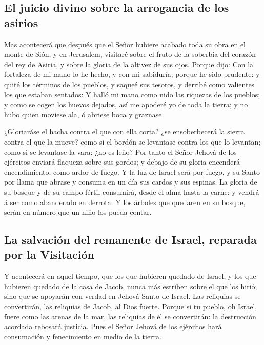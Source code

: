 \hypertarget{el-juicio-divino-sobre-la-arrogancia-de-los-asirios}{%
\subsection{El juicio divino sobre la arrogancia de los
asirios}\label{el-juicio-divino-sobre-la-arrogancia-de-los-asirios}}

 Mas acontecerá que después que el Señor hubiere acabado
toda su obra en el monte de Sión, y en Jerusalem, visitaré sobre el
fruto de la soberbia del corazón del rey de Asiria, y sobre la gloria de
la altivez de sus ojos.  Porque dijo: Con la fortaleza de
mi mano lo he hecho, y con mi sabiduría; porque he sido prudente: y
quité los términos de los pueblos, y saqueé sus tesoros, y derribé como
valientes los que estaban sentados:  Y halló mi mano como
nido las riquezas de los pueblos; y como se cogen los huevos dejados,
así me apoderé yo de toda la tierra; y no hubo quien moviese ala, ó
abriese boca y graznase.

 ¿Gloriaráse el hacha contra el que con ella corta? ¿se
ensoberbecerá la sierra contra el que la mueve? como si el bordón se
levantase contra los que lo levantan; como si se levantase la vara: ¿no
es leño?  Por tanto el Señor Jehová de los ejércitos
enviará flaqueza sobre sus gordos; y debajo de su gloria encenderá
encendimiento, como ardor de fuego.  Y la luz de Israel
será por fuego, y su Santo por llama que abrase y consuma en un día sus
cardos y sus espinas.  La gloria de su bosque y de su
campo fértil consumirá, desde el alma hasta la carne: y vendrá á ser
como abanderado en derrota.  Y los árboles que quedaren
en su bosque, serán en número que un niño los pueda contar.

\hypertarget{la-salvaciuxf3n-del-remanente-de-israel-reparada-por-la-visitaciuxf3n}{%
\subsection{La salvación del remanente de Israel, reparada por la
Visitación}\label{la-salvaciuxf3n-del-remanente-de-israel-reparada-por-la-visitaciuxf3n}}

 Y acontecerá en aquel tiempo, que los que hubieren
quedado de Israel, y los que hubieren quedado de la casa de Jacob, nunca
más estriben sobre el que los hirió; sino que se apoyarán con verdad en
Jehová Santo de Israel.  Las reliquias se convertirán,
las reliquias de Jacob, al Dios fuerte.  Porque si tu
pueblo, oh Israel, fuere como las arenas de la mar, las reliquias de él
se convertirán: la destrucción acordada rebosará justicia.
 Pues el Señor Jehová de los ejércitos hará consumación y
fenecimiento en medio de la tierra.

